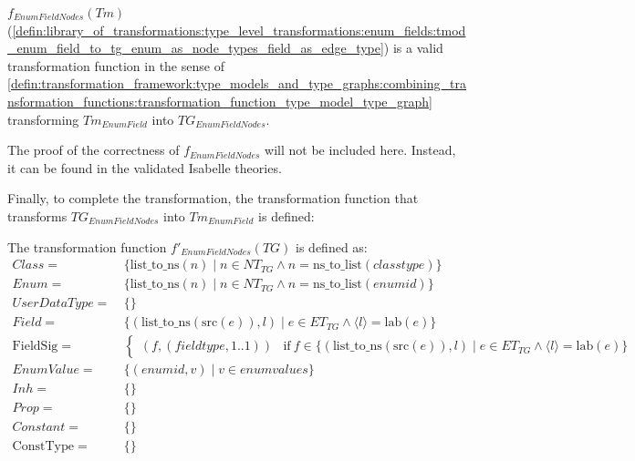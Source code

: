 \begin{thm}
\label{defin:library_of_transformations:type_level_transformations:enum_fields:tmod_enum_field_to_tg_enum_as_node_types_field_as_edge_type_func}
$f_{EnumFieldNodes}(Tm)$ (\cref{defin:library_of_transformations:type_level_transformations:enum_fields:tmod_enum_field_to_tg_enum_as_node_types_field_as_edge_type}) is a valid transformation function in the sense of \cref{defin:transformation_framework:type_models_and_type_graphs:combining_transformation_functions:transformation_function_type_model_type_graph} transforming $Tm_{EnumField}$ into $TG_{EnumFieldNodes}$.
\end{thm}

The proof of the correctness of $f_{EnumFieldNodes}$ will not be included here. Instead, it can be found in the validated Isabelle theories.

Finally, to complete the transformation, the transformation function that transforms $TG_{EnumFieldNodes}$ into $Tm_{EnumField}$ is defined:

\begin{defin}
\label{defin:library_of_transformations:type_level_transformations:enum_fields:tg_enum_as_node_types_field_as_edge_type_to_tmod_enum_field}
The transformation function $f'_{EnumFieldNodes}(TG)$ is defined as:
\begin{align*}
Class =\ &\{\mathrm{list\_\!to\_\!ns}(n) \mid n \in NT_{TG} \land n = \mathrm{ns\_\!to\_\!list}(classtype) \} \\
Enum =\ &\{\mathrm{list\_\!to\_\!ns}(n) \mid n \in NT_{TG} \land n = \mathrm{ns\_\!to\_\!list}(enumid) \} \\
UserDataType =\ &\{\} \\
Field =\ &\{(\mathrm{list\_\!to\_\!ns}(\mathrm{src}(e)), l) \mid e \in ET_{TG} \land \langle l \rangle = \mathrm{lab}(e) \} \\
\mathrm{FieldSig} =\ &\begin{cases}
    (f, (fieldtype, 1..1)) &\mathrm{if}\ f \in \{(\mathrm{list\_\!to\_\!ns}(\mathrm{src}(e)), l) \mid e \in ET_{TG} \land \langle l \rangle = \mathrm{lab}(e) \}
\end{cases} \\
EnumValue =\ &\{(enumid, v) \mid v \in enumvalues\} \\
Inh =\ &\{\} \\
Prop =\ &\{\} \\
Constant =\ &\{\} \\
\mathrm{ConstType} =\ &\{\}
\end{align*}
\end{defin}


